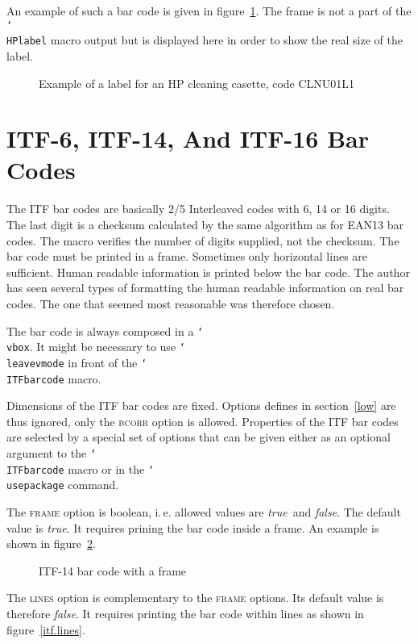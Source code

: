 \documentclass[11pt]{article}
\makeatletter
\def\mg#1{\ifvmode\leavevmode\fi\marginpar{\texttt{#1}}\ignorespaces}
\def\cmg#1{\mg{\char`\\#1}}
\def\omg#1{\ifvmode\leavevmode\fi\marginpar{\raggedright\hspace{0pt}\opt{#1}}\ignorespaces}
\def\opt#1{\texorpdfstring{\textmd{\textsc{#1}}}{#1}}
\DeclareRobustCommand\cmd[1]{\texttt{\char`\\#1}}
\def\ie.{i.\,e.\@}
\def\true{\bool{true}}
\def\false{\bool{false}}
\def\bool#1{\texorpdfstring{\textit{#1}}{#1}}
\let\zwcomma\,
\def\,{\texorpdfstring{\zwcomma}{}}
\makeatother
\begin{document}
An example of such a bar code is given in figure~\ref{hp}. The frame
is not a part of the \cmd{HPlabel} macro output but is displayed here in order to show the real
size of the label.

\begin{figure}[hbt]
\begin{center}
\fboxsep 0mm
\end{center}
\caption{Example of a label for an HP cleaning casette, code CLNU01L1}\label{hp}
\end{figure}

\section{ITF-6, ITF-14, And ITF-16 Bar Codes}\label{itf}
\cmg{ITFbarcode}
The ITF bar codes are basically 2/5 Interleaved codes with 6, 14 or 16 digits. The last digit is a
checksum calculated by the same algorithm as for EAN13 bar codes. The macro verifies the number of
digits supplied, not the checksum. The bar code must be printed in a
frame. Sometimes only horizontal lines are sufficient. Human readable information is printed below
the bar code. The author has seen several types of formatting the human readable information on real bar
codes. The one that seemed most reasonable was therefore chosen.

The bar code is always composed in a \cmd{vbox}. It might be necessary to use \cmd{leavevmode} in
front of the \cmd{ITFbarcode} macro.

Dimensions of the ITF bar codes are fixed. Options defines in section~\ref{low} are thus ignored,
only the \opt{bcorr} option is allowed. Properties of the ITF bar codes are selected by a special
set of options that can be given either as an optional argument to the \cmd{ITFbarcode} macro or in
the \cmd{usepackage} command.

\omg{frame}
The \opt{frame} option is boolean, \ie. allowed values are \true\ and \false. The default value is
\true. It requires prining the bar code inside a frame. An example is shown in
figure~\ref{itf.frame}.

\begin{figure}[hbt]
\begin{center}
\leavevmode{}
\end{center}
\caption{ITF-14 bar code with a frame}\label{itf.frame}
\end{figure}

\omg{lines}
The \opt{lines} option is complementary to the \opt{frame} options. Its default value is therefore
\false. It requires printing the bar code within lines as shown in figure~\ref{itf.lines}.
\end{document}

